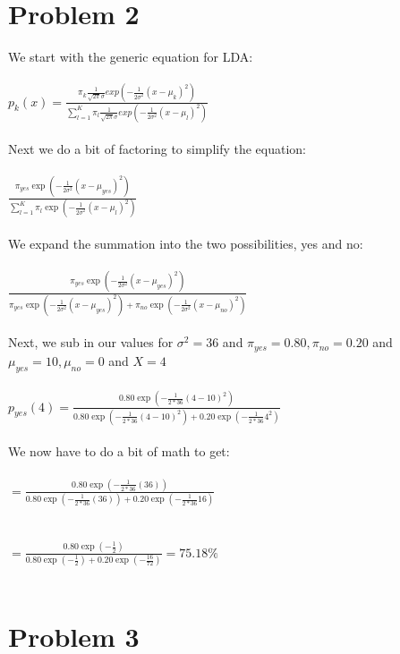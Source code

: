 \documentclass{article}
\begin{document}
\section*{Problem 2}
We start with the generic equation for LDA:\\\\
$p_k(x) = \frac {\pi_k \frac {1} {\sqrt{2 \pi} \sigma} exp(- \frac {1} {2 \sigma^2} (x - \mu_k)^2)}  {\sum\limits_{l=1}^K { \pi_l \frac {1} {\sqrt{2 \pi} \sigma} exp(- \frac {1} {2 \sigma^2} (x - \mu_l)^2) }}$ \\ \\
Next we do a bit of factoring to simplify the equation:\\\\
$ \frac {\pi_{yes} \exp(- \frac {1} {2 \sigma^2} (x - \mu_{yes})^2) } {\sum\limits_{l=1}^K { \pi_l \exp(- \frac {1} {2 \sigma^2} (x - \mu_l)^2) }}$ \\\\
We expand the summation into the two possibilities, yes and no:\\\\
$\frac {\pi_{yes} \exp(- \frac {1} {2 \sigma^2} (x - \mu_{yes})^2)} { \pi_{yes} \exp(- \frac {1} {2 \sigma^2} (x - \mu_{yes})^2) + \pi_{no} \exp(- \frac {1} {2 \sigma^2} (x - \mu_{no})^2) }$\\\\
Next, we sub in our values for $\sigma^2 = 36$ and $\pi_{yes} = 0.80, \pi_{no} = 0.20$ and $\mu_{yes} = 10,  \mu_{no} = 0$ and $X = 4$\\\\
$p_{yes}(4) = \frac {0.80 \exp(- \frac {1} {2 * 36} (4 - 10)^2)} { 0.80 \exp(- \frac {1} {2 * 36} (4 - 10)^2) + 0.20 \exp(- \frac {1} {2 * 36} 4^2) }$ \\\\    
We now have to do a bit of math to get:\\\\
$ = \frac {0.80 \exp(- \frac {1} {2*36} (36))} { 0.80 \exp(- \frac {1} {2*36} (36)) + 0.20 \exp(- \frac {1} {2*36} 16) }$\\\\\\

$ = \frac {0.80 \exp(- \frac {1} {2})} { 0.80 \exp(- \frac {1} {2}) + 0.20 \exp(- \frac {16} {72}) } = 75.18\%$\\\\

\section*{Problem 3}
\end{document}

